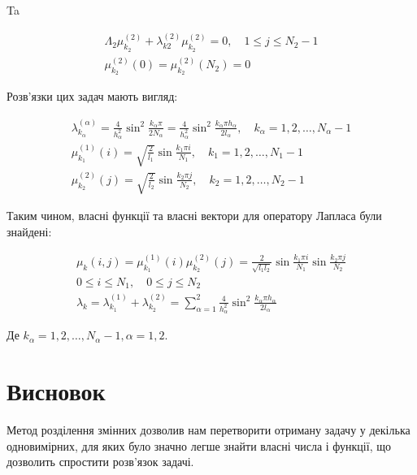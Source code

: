 Ta

$$
\begin{gathered}
\Lambda_{2} \mu_{k_{2}}^{(2)}+\lambda_{k 2}^{(2)} \mu_{k_{2}}^{(2)}=0, \quad 1 \leq j \leq N_{2}-1 \\
\mu_{k_{2}}^{(2)}(0)=\mu_{k_{2}}^{(2)}\left(N_{2}\right)=0
\end{gathered}
$$

Розв'язки цих задач мають вигляд:

$$
\begin{gathered}
\lambda_{k_{\alpha}}^{(\alpha)}=\frac{4}{h_{\alpha}^{2}} \sin ^{2} \frac{k_{\alpha} \pi}{2 N_{\alpha}}=\frac{4}{h_{\alpha}^{2}} \sin ^{2} \frac{k_{\alpha} \pi h_{\alpha}}{2 l_{\alpha}}, \quad k_{\alpha}=1,2, \ldots, N_{\alpha}-1 \\
\mu_{k_{1}}^{(1)}(i)=\sqrt{\frac{2}{l_{1}}} \sin \frac{k_{1} \pi i}{N_{1}}, \quad k_{1}=1,2, \ldots, N_{1}-1 \\
\mu_{k_{2}}^{(2)}(j)=\sqrt{\frac{2}{l_{2}}} \sin \frac{k_{2} \pi j}{N_{2}}, \quad k_{2}=1,2, \ldots, N_{2}-1
\end{gathered}
$$



Таким чином, власні функції та власні вектори для оператору Лапласа були знайдені:

$$
\begin{gathered}
\mu_{k}(i, j)=\mu_{k_{1}}^{(1)}(i) \mu_{k_{2}}^{(2)}(j)=\frac{2}{\sqrt{l_{1} l_{2}}} \sin \frac{k_{1} \pi i}{N_{1}} \sin \frac{k_{2} \pi j}{N_{2}} \\
0 \leq i \leq N_{1}, \quad 0 \leq j \leq N_{2} \\
\lambda_{k}=\lambda_{k_{1}}^{(1)}+\lambda_{k_{2}}^{(2)}=\sum_{\alpha=1}^{2} \frac{4}{h_{\alpha}^{2}} \sin ^{2} \frac{k_{\alpha} \pi h_{\alpha}}{2 l_{\alpha}}
\end{gathered}
$$

Де $k_{\alpha}=1,2, \ldots, N_{\alpha}-1, \alpha=1,2$.

\section{Висновок}

Метод розділення змінних дозволив нам перетворити отриману задачу у декілька одновимірних, для яких було значно легше знайти власні числа і функції, що дозволить спростити розв'язок задачі.